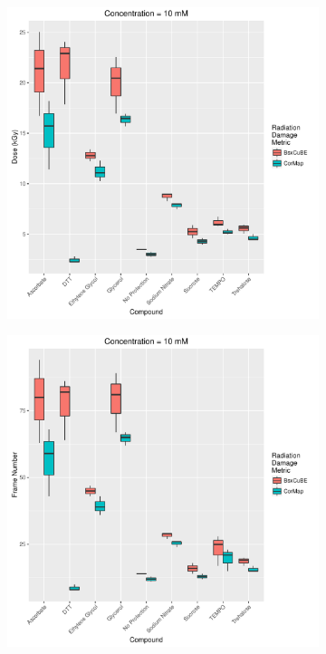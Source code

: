 \begin{figure}
\begin{subfigure}[b]{0.45\textwidth}
            \caption{}
            \label{fig:SAXS frame- 1mM}
    \end{subfigure}
    \\
    \begin{subfigure}[b]{0.45\textwidth}
            \centering
            \includegraphics[width=\textwidth]{figures/saxs/Conc_10_dose.pdf}
            \caption{}
            \label{fig:SAXS dose- 10mM}
    \end{subfigure}
    \qquad
    \begin{subfigure}[b]{0.45\textwidth}
            \centering
            \includegraphics[width=\textwidth]{figures/saxs/Conc_10_frame_num.pdf}

\end{subfigure}
\end{figure}
